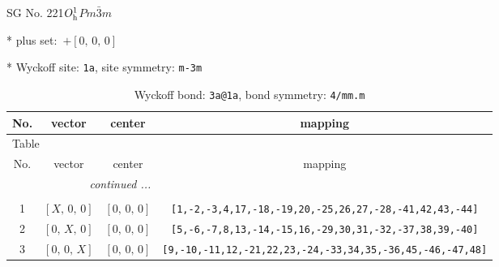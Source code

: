\documentclass[fleqn,8pt]{jsarticle}
\begin{document}
\setcounter{MaxMatrixCols}{32}

\renewcommand{\tablename}{Table~}
\renewcommand{\figurename}{Figure~}
\begin{center}
\LARGE
SG No. 221\quad$O_{\rm h}^{1}$\quad$Pm\bar{3}m$\quad[ cubic ]
\end{center}

* plus set:\,\,\,$+\left[ 0,\, 0,\, 0 \right]$


* Wyckoff site: {\tt 1a}, site symmetry: {\tt m-3m}
\renewcommand{\arraystretch}{1.2}
\begin{longtable}{cccc}
\caption{Wyckoff bond: {\tt 3a@1a}, bond symmetry: {\tt 4/mm.m}}
 \\
 \hline \hline
No. & vector & center & mapping \\ \hline \endfirsthead

\multicolumn{3}{l}{\tablename\ \thetable{}} \\
 \hline \hline
No. & vector & center & mapping \\ \hline \endhead

 \hline \hline
\multicolumn{3}{r}{\footnotesize\it continued ...} \\ \endfoot

 \hline \hline
\multicolumn{3}{r}{} \\ \endlastfoot

1 & $\left[ X,\, 0,\, 0 \right]$ & $\left[ 0,\, 0,\, 0 \right]$ & {\tt [1,-2,-3,4,17,-18,-19,20,-25,26,27,-28,-41,42,43,-44]} \\ \hline
2 & $\left[ 0,\, X,\, 0 \right]$ & $\left[ 0,\, 0,\, 0 \right]$ & {\tt [5,-6,-7,8,13,-14,-15,16,-29,30,31,-32,-37,38,39,-40]} \\ \hline
3 & $\left[ 0,\, 0,\, X \right]$ & $\left[ 0,\, 0,\, 0 \right]$ & {\tt [9,-10,-11,12,-21,22,23,-24,-33,34,35,-36,45,-46,-47,48]} \\
\end{longtable}
\renewcommand{\arraystretch}{1.2}
\end{document}
